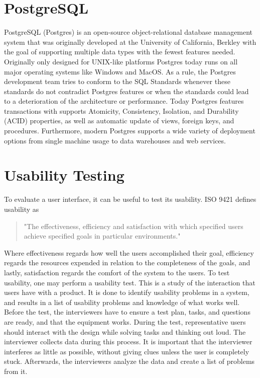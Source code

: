 \section*{PostgreSQL}
PostgreSQL (Postgres) is an open-source object-relational database management system that was originally developed at the University of California, Berkley with the goal of supporting multiple data types with the fewest features needed. Originally only designed for UNIX-like platforms Postgres today runs on all major operating systems like Windows and MacOS\cite{Postgres_Docs}.
As a rule, the Postgres development team tries to conform to the SQL Standards whenever these standards do not contradict Postgres features or when the standards could lead to a deterioration of the architecture or performance\cite{Postgres_Docs}.
Today Postgres features transactions with supports Atomicity, Consistency, Isolation, and Durability (ACID) properties, as well as automatic update of views, foreign keys, and procedures.
Furthermore, modern Postgres supports a wide variety of deployment options from single machine usage to data warehouses and web services\cite{Postgres_Docs}.

\section*{Usability Testing}
To evaluate a user interface, it can be useful to test its usability. ISO 9421 defines usability as
\begin{quote}
	"The effectiveness, efficiency and satisfaction with which specified users achieve specified goals in particular environments."
\end{quote}
Where effectiveness regards how well the users accomplished their goal, efficiency regards the resources expended in relation to the completeness of the goals, and lastly, satisfaction regards the comfort of the system to the users.
To test usability, one may perform a usability test. This is a study of the interaction that users have with a product. It is done to identify usability problems in a system, and results in a list of usability problems and knowledge of what works well.
Before the test, the interviewers have to ensure a test plan, tasks, and questions are ready, and that the equipment works. 
During the test, representative users should interact with the design while solving tasks and thinking out loud. The interviewer collects data during this process. It is important that the interviewer interferes as little as possible, without giving clues unless the user is completely stuck.
Afterwards, the interviewers analyze the data and create a list of problems from it. 
\cite{deb7}

